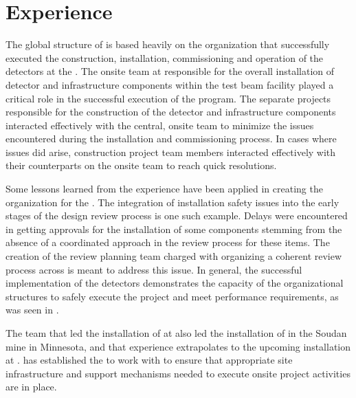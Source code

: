 \section{ Experience}
\label{sec:dune_protodune}

The global structure of  is based heavily on 
the organization that successfully executed the construction,
installation, commissioning and operation of the 
detectors at the .  The onsite team at  
responsible for the overall installation of detector and 
infrastructure components within the test beam facility played a 
critical role in the successful execution of the  
program.  The separate projects responsible for the construction 
of the detector and infrastructure components interacted effectively 
with the central, onsite team to minimize the issues encountered 
during the installation and commissioning process.  In cases where 
issues did arise, construction project team members interacted 
effectively with their counterparts on the onsite team to reach 
quick resolutions.

Some lessons learned from the  experience have 
been applied in creating the  organization for 
the  .  The integration of installation 
safety issues into the early stages of the design review process 
is one such example.  Delays were encountered in getting approvals 
for the installation of some  components stemming from 
the absence of a coordinated approach in the review process for 
these items.  The creation of the  review planning 
team charged with organizing a coherent review process across 
 is meant to address this issue.  In general, 
the successful implementation of the  detectors 
demonstrates the capacity of the organizational structures to 
safely execute the project and meet performance requirements, as 
was seen in .

The team that led the installation of  at
 also led the installation of  in the 
Soudan mine in Minnesota, and that experience extrapolates to 
the upcoming installation at .  has 
established the  to work with  to 
ensure that appropriate site infrastructure and support mechanisms 
needed to execute onsite project activities are in place.
